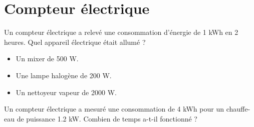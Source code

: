 \section{Compteur électrique}

\begin{questions}
	\question Un compteur électrique a relevé une consommation d'énergie de 1 kWh en 2 heures. Quel appareil électrique était allumé ?
	
	\begin{itemize}
		\item Un mixer de 500 W.
		\item Une lampe halogène de 200 W.
		\item Un nettoyeur vapeur de \num{2000} W.
	\end{itemize}

	\fillwithdottedlines{2cm}
	
	\question Un compteur électrique a mesuré une consommation de 4 kWh pour un chauffe-eau de puissance \num{1.2} kW. Combien de temps a-t-il fonctionné ?
	
	\fillwithdottedlines{3cm}
\end{questions}